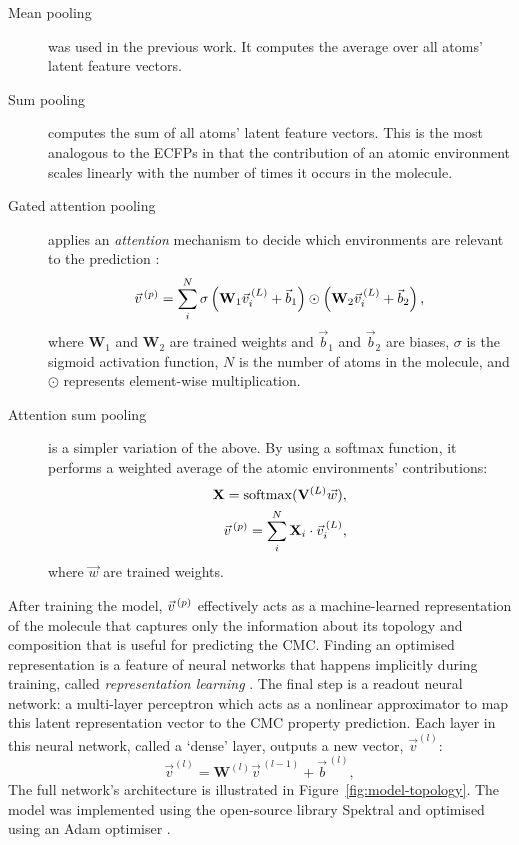\begin{description}
    \item[Mean pooling] was used in the previous work. It computes the average
          over all atoms' latent feature vectors.
    \item[Sum pooling] computes the sum of all atoms' latent feature vectors.
          This is the most analogous to the ECFPs in that the contribution of an atomic environment scales linearly with the number of times it occurs
          in the molecule.
    \item[Gated attention pooling] applies an \emph{attention} mechanism to decide which environments
          are relevant to the prediction \cite{liGatedGraphSequence2017}:
          \begin{equation}
              \vec{v}^{\,(p)}{} = \sum_i^N \sigma\left(\mathbf{W}_1 \vec{v}_i^{\,(L)} + \vec{b}_1 \right) \odot \left(\mathbf{W}_2 \vec{v}_i^{\,(L)} + \vec{b}_2 \right),
          \end{equation}
          where $\mathbf{W}_1$ and $\mathbf{W}_2$ are trained weights and
          $\vec{b}_1$ and $\vec{b}_2$ are biases, $\sigma$ is the sigmoid
          activation function, $N$ is the number of atoms in the molecule, and
          $\odot$ represents element-wise multiplication.
    \item[Attention sum pooling] is a simpler variation of the above. By using a
          softmax function, it performs a weighted average of the atomic environments'
          contributions:
          \begin{align}
              \mathbf{X} = \mathrm{softmax}(\mathbf{V}^{(L)}\vec{w}), \\
              \vec{v}^{\,(p)}{} = \sum_i^N \mathbf{X}_i \cdot \vec{v}^{\,(L)}_i,
          \end{align}
          where $\vec{w}$ are trained weights.
\end{description}

After training the model, $\vec{v}^{\,(p)}{}$ effectively acts as a machine-learned representation of the molecule that captures only the information about its topology and composition that is useful for predicting the CMC. Finding an optimised representation is a feature of neural networks that happens implicitly during training, called \emph{representation learning} \cite{goodfellowRepresentationLearning2016}.
The final step is a readout neural network: a multi-layer perceptron which acts as a nonlinear approximator to map this
latent representation vector to the CMC property prediction. Each layer in this neural network, called a `dense' layer, outputs a new vector, $\vec{v}^{(l)}$:
\begin{equation}
    \vec{v}^{(l)} = \mathbf{W}^{(l)}\vec{v}^{\,(l-1)} + \vec{b}^{\,(l)},
\end{equation}
The full network's architecture is illustrated in Figure~\ref{fig:model-topology}. The model was implemented using the open-source library Spektral\cite{grattarolaGraphNeuralNetworks2020} and optimised using an Adam optimiser \cite{kingmaAdamMethodStochastic2017a}.

